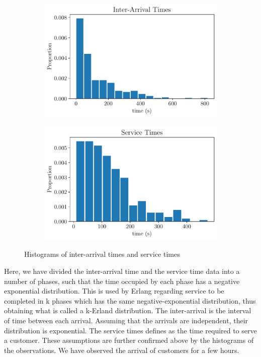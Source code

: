 \documentclass{article}
\begin{document}
\begin{figure}[H]
    \centering
    \begin{subfigure}[b]{0.45\textwidth}
        \centering
        \includegraphics[width=\textwidth]{fig1.pdf}
        \caption{}
        \label{fig:img1}
    \end{subfigure}
    \hfill
    \begin{subfigure}[b]{0.45\textwidth}
        \centering
        \includegraphics[width=\textwidth]{fig2.pdf}
        \caption{}
        \label{fig:img2}
    \end{subfigure}

    \caption{Histograms of inter-arrival times and service times}
    \label{fig:two-figs}
\end{figure}

Here, we have divided the inter-arrival time and the service time data into a number of phases, such that the time occupied by each phase has a negative exponential distribution. This is used by Erlang regarding service to be completed in k phases which has the same negative-exponential distribution, thus obtaining what is called a k-Erland distribution.
The inter-arrival is the interval of time between each arrival. Assuming that the arrivals are independent, their distribution is exponential.
The service times defines as the time required to serve a customer. 
These assumptions are further confirmed above by the histograms of the observations. We have observed the arrival of customers for a few hours.
\end{document}
